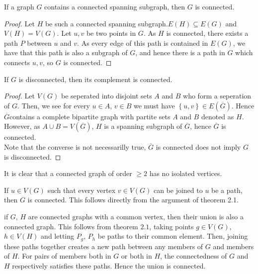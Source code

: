 \begin{proposition}
	If a graph $G$ contains a connected spanning subgraph, then $G$ is connected.
\end{proposition}
\begin{proof}
	Let $H$ be such a connected spanning subgraph.$E\left( H \right)  \subseteq E\left( G \right) $ and $V\left( H  \right) = V\left( G \right)$. Let $u, v$ be two points in $G$. As $H$ is connected, there exists a path $P$ between $u$ and $v$. As every edge of this path is contained in $E\left( G \right) $, we have that this path is also a subgraph of $G$, and hence there is a path in $G$ which connects $u, v$, so $G$ is connected.
\end{proof}
\begin{theorem}
	If $G$ is disconnected, then its complement is connected.
\end{theorem}
\begin{proof}
	Let $V\left( G \right) $ be seperated into disjoint sets $A$ and $B$ who form a seperation of $G$. Then, we see for every $u \in A$, $v \in B$ we must have $\left\{ u,v \right\}  \in E\left( \overline{G} \right) $. Hence $\overline{G}$contains a complete bipartite graph with partite sets $A$ and $B$ denoted as $H$. However, as $A \cup B = V\left( \overline{G} \right) $, $H$ is a spanning subgraph of $\overline{G}$, hence $\overline{G}$ is connected.\\
	Note that the converse is not necessarilly true, $\overline{G}$ is connected does not imply $G$ is disconnected.
\end{proof}
It is clear that a connected graph of order $\ge 2$ has no isolated vertices.
\begin{theorem}
	If $u \in V\left( G \right) $ such that every vertex $v \in V\left( G \right) $ can be joined to $u$ be a path, then $G$ is connected. This follows directly from the argument of theorem 2.1.
\end{theorem}
\begin{theorem}
	if $G$, $H$ are connected graphs with a common vertex, then their union is also a connected graph. This follows from theorem $2.1$, taking points $g \in V\left( G \right) $, $h \in V\left( H \right) $ and letting $P_{g}$, $P_{h}$ be paths to their common element. Then, joining these paths together creates a new path between any members of $G$ and members of $H$. For pairs of members both in $G$ or both in $H$, the connectedness of $G$ and $H$ respectively satisfies these paths. Hence the union is connected.
\end{theorem}
